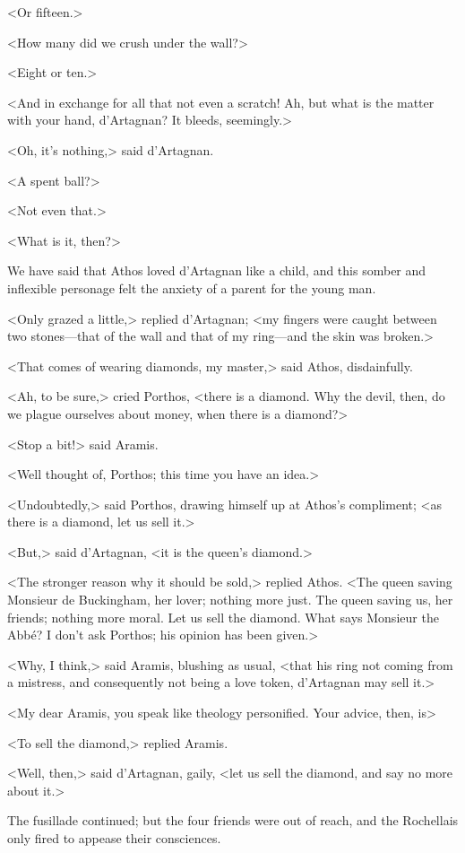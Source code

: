 <Or fifteen.> 

<How many did we crush under the wall?> 

<Eight or ten.> 

<And in exchange for all that not even a scratch! Ah, but what is the matter with your hand, d'Artagnan? It bleeds, seemingly.> 

<Oh, it's nothing,> said d'Artagnan. 

<A spent ball?> 

<Not even that.> 

<What is it, then?> 

We have said that Athos loved d'Artagnan like a child, and this somber and inflexible personage felt the anxiety of a parent for the young man. 

<Only grazed a little,> replied d'Artagnan; <my fingers were caught between two stones---that of the wall and that of my ring---and the skin was broken.> 

<That comes of wearing diamonds, my master,> said Athos, disdainfully. 

<Ah, to be sure,> cried Porthos, <there is a diamond. Why the devil, then, do we plague ourselves about money, when there is a diamond?> 

<Stop a bit!> said Aramis. 

<Well thought of, Porthos; this time you have an idea.> 

<Undoubtedly,> said Porthos, drawing himself up at Athos's compliment; <as there is a diamond, let us sell it.> 

<But,> said d'Artagnan, <it is the queen's diamond.> 

<The stronger reason why it should be sold,> replied Athos. <The queen saving Monsieur de Buckingham, her lover; nothing more just. The queen saving us, her friends; nothing more moral. Let us sell the diamond. What says Monsieur the Abbé? I don't ask Porthos; his opinion has been given.> 

<Why, I think,> said Aramis, blushing as usual, <that his ring not coming from a mistress, and consequently not being a love token, d'Artagnan may sell it.> 

<My dear Aramis, you speak like theology personified. Your advice, then, is\longdash> 

<To sell the diamond,> replied Aramis. 

<Well, then,> said d'Artagnan, gaily, <let us sell the diamond, and say no more about it.> 

The fusillade continued; but the four friends were out of reach, and the Rochellais only fired to appease their consciences. 


